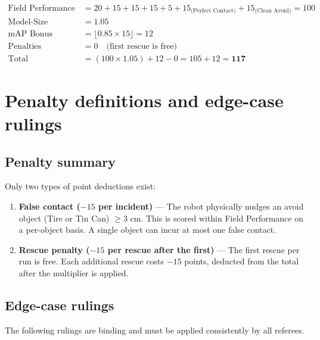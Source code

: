 \documentclass[a4]{article}
\begin{document}
\begin{align*}
\text{Field Performance} &= 20 + 15 + 15 + 15 + 5 + 15_{\text{(Perfect Contact)}} + 15_{\text{(Clean Avoid)}} = 100 \\
\text{Model-Size Multiplier} &= 1.05 \\
\text{mAP Bonus} &= \lfloor 0.85 \times 15 \rfloor = 12 \\
\text{Penalties} &= 0 \quad \text{(first rescue is free)} \\
\text{Total} &= (100 \times 1.05) + 12 - 0 = 105 + 12 = \mathbf{117}
\end{align*}

\section*{Penalty definitions and edge-case rulings}
\subsection*{Penalty summary}

Only two types of point deductions exist:

\begin{enumerate}
    \item \textbf{False contact ($-15$ per incident)} --- The robot physically nudges an avoid object (Tire or Tin Can) $\geq$3 cm. This is scored within Field Performance on a per-object basis. A single object can incur at most one false contact.
    \item \textbf{Rescue penalty ($-15$ per rescue after the first)} --- The first rescue per run is free. Each additional rescue costs $-15$ points, deducted from the total after the multiplier is applied.
\end{enumerate}

\subsection*{Edge-case rulings}

The following rulings are binding and must be applied consistently by all referees.
\end{document}
